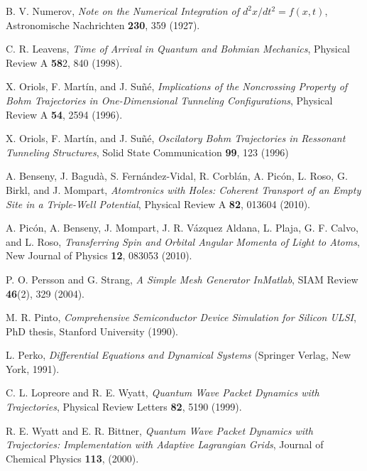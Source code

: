 \documentclass[nofootinbib, secnumarabic, amsmath, nobibnotes,11pt,aps,pra, floatfix]{revtex4-1}
\begin{document}
\begin{thebibliography}{999}
B. V. Numerov, \emph{Note on the Numerical Integration of $d^2 x/dt^2 = f(x,t)$}, Astronomische Nachrichten \textbf{230},  359 (1927).

C. R. Leavens, \emph{Time of Arrival in Quantum and Bohmian Mechanics}, Physical Review A \textbf{58}2,  840 (1998).

X. Oriols, F. Mart\'{i}n, and J. Su\~{n}\'{e}, \emph{Implications of the Noncrossing Property of Bohm Trajectories in One-Dimensional Tunneling Configurations}, Physical Review A \textbf{54},  2594 (1996).

X. Oriols, F. Mart\'{i}n, and J. Su\~{n}\'{e}, \emph{Oscilatory Bohm Trajectories in Ressonant Tunneling Structures}, Solid State Communication \textbf{99},  123 (1996)

A. Benseny, J. Bagud\` {a}, S. Fern\'{a}ndez-Vidal, R. Corbl\'{a}n, A. Pic\'{o}n, L. Roso, G. Birkl, and J. Mompart, \emph{Atomtronics with Holes: Coherent Transport of an Empty Site in a Triple-Well Potential}, Physical Review A \textbf{82},  013604 (2010).

A. Pic\'{o}n, A. Benseny, J. Mompart, J. R. V\'{a}zquez Aldana, L. Plaja, G. F. Calvo, and L. Roso, \emph{Transferring Spin and Orbital Angular Momenta of Light to Atoms}, New Journal of Physics \textbf{12},  083053 (2010).

P. O. Persson and G. Strang, \emph{A Simple Mesh Generator InMatlab}, SIAM Review \textbf{46}(2),  329 (2004).

M. R. Pinto, \emph{Comprehensive Semiconductor Device Simulation for Silicon ULSI}, PhD thesis, Stanford University (1990).

L. Perko, \emph{Differential Equations and Dynamical Systems} (Springer Verlag, New York, 1991).

C. L. Lopreore and R. E. Wyatt, \emph{Quantum Wave Packet Dynamics with Trajectories}, Physical Review Letters \textbf{82},  5190 (1999).

R. E. Wyatt and E. R. Bittner, \emph{Quantum Wave Packet Dynamics with Trajectories: Implementation with Adaptive Lagrangian Grids}, Journal of Chemical Physics \textbf{113},  (2000).


\end{thebibliography}
\end{document}
